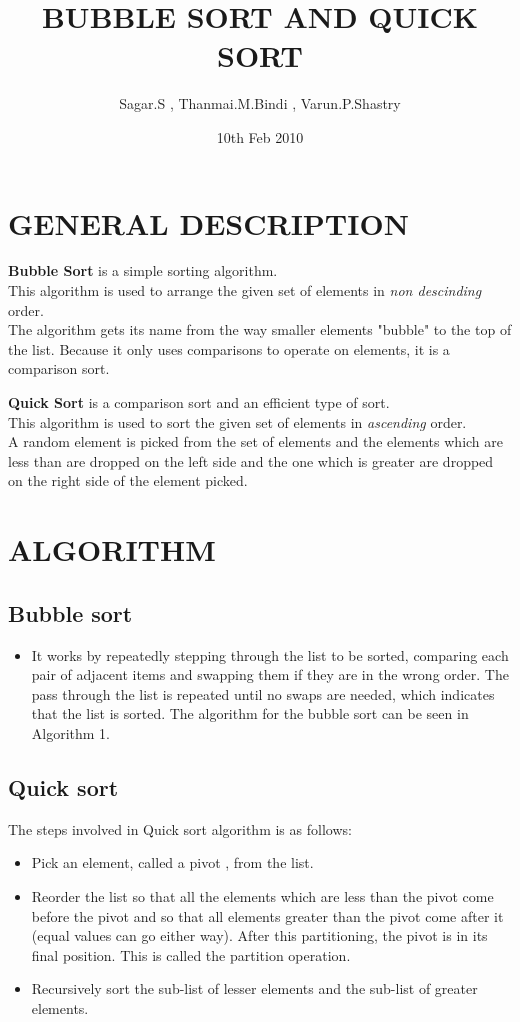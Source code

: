 \documentclass{article}
\begin{document}
\title{BUBBLE SORT AND QUICK SORT}
\author{Sagar.S , Thanmai.M.Bindi , Varun.P.Shastry }
\date{10th Feb 2010}
\maketitle



\section{GENERAL DESCRIPTION}
\textbf{Bubble Sort} is a simple sorting algorithm.\\
This algorithm is used to arrange the given set of elements in \textit{non descinding} order.\\
The algorithm gets its name from the way smaller elements "bubble" to the top of the list. Because it only uses comparisons to operate on elements, it is a comparison sort.

\textbf{Quick Sort} is a comparison sort and an efficient type of sort.\\
This algorithm is used to sort the given set of elements in \textit{ascending} order.\\
A random element is picked from the set of elements and the elements which are less than are dropped on the left side and the one which is greater are dropped on the right side of the element picked.

\section{ALGORITHM}
\subsection{Bubble sort}
\begin{itemize}
\item  It works by repeatedly stepping through the list to be sorted, comparing each pair of adjacent items and swapping them if they are in the wrong order. The pass through the list is repeated until no swaps are needed, which indicates that the list is sorted. 
The algorithm for the bubble sort can be seen in Algorithm 1.


\end{itemize}
\subsection{Quick sort}
The steps involved in Quick sort algorithm is as follows:
\begin{itemize}
\item  Pick an element, called a pivot , from the list.
\item  Reorder the list so that all the elements which are less than the pivot come before the pivot and so that all elements greater than the pivot come after it (equal values can go either way). After this partitioning, the pivot is in its final position. This is called the partition operation.
\item  Recursively sort the sub-list of lesser elements and the sub-list of greater elements.
\end{itemize}
\end{document}
